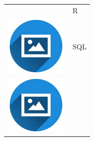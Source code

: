 \documentclass{article}
\begin{document}
\begin{paracol}{2}
\begin{tabular}{ll}
\begin{minipage}{0.1\linewidth}
         \end{minipage} & {R} \\[10pt]
         \begin{minipage}{0.1\linewidth}
         \includegraphics[width=\linewidth]{picon.png}
         \end{minipage} & {SQL} \\[10pt]
         \begin{minipage}{0.1\linewidth}
         \includegraphics[width=\linewidth]{picon.png}

\end{minipage}
\end{tabular}
\end{paracol}
\end{document}
